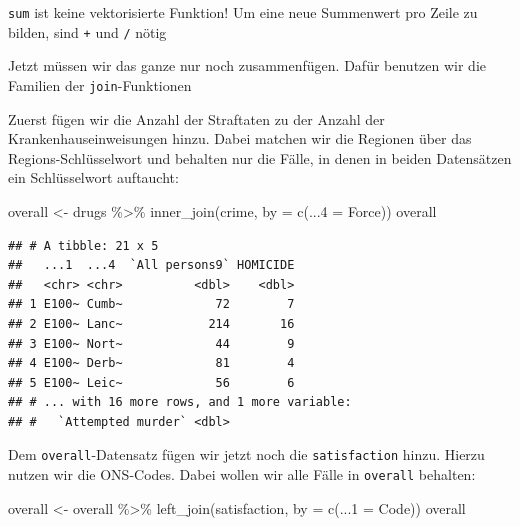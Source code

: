 \documentclass[
]{book}
\newenvironment{Shaded}{\begin{snugshade}}{\end{snugshade}}
\newcommand{\AttributeTok}[1]{\textcolor[rgb]{0.77,0.63,0.00}{#1}}
\newcommand{\FunctionTok}[1]{\textcolor[rgb]{0.00,0.00,0.00}{#1}}
\newcommand{\NormalTok}[1]{#1}
\newcommand{\OtherTok}[1]{\textcolor[rgb]{0.56,0.35,0.01}{#1}}
\newcommand{\SpecialCharTok}[1]{\textcolor[rgb]{0.00,0.00,0.00}{#1}}
\newcommand{\StringTok}[1]{\textcolor[rgb]{0.31,0.60,0.02}{#1}}
\begin{document}
\texttt{sum} ist keine vektorisierte Funktion! Um eine neue Summenwert pro Zeile zu bilden, sind \texttt{+} und \texttt{/} nötig

Jetzt müssen wir das ganze nur noch zusammenfügen. Dafür benutzen wir die Familien der \texttt{join}-Funktionen

Zuerst fügen wir die Anzahl der Straftaten zu der Anzahl der Krankenhauseinweisungen hinzu. Dabei matchen wir die Regionen über das Regions-Schlüsselwort und behalten nur die Fälle, in denen in beiden Datensätzen ein Schlüsselwort auftaucht:

\begin{Shaded}
\begin{Highlighting}[]
\NormalTok{overall }\OtherTok{\textless{}{-}}\NormalTok{ drugs }\SpecialCharTok{\%\textgreater{}\%} 
  \FunctionTok{inner\_join}\NormalTok{(crime, }\AttributeTok{by =} \FunctionTok{c}\NormalTok{(}\StringTok{\textquotesingle{}...4\textquotesingle{}} \OtherTok{=} \StringTok{\textquotesingle{}Force\textquotesingle{}}\NormalTok{))}
\NormalTok{overall}
\end{Highlighting}
\end{Shaded}

\begin{verbatim}
## # A tibble: 21 x 5
##   ...1  ...4  `All persons9` HOMICIDE
##   <chr> <chr>          <dbl>    <dbl>
## 1 E100~ Cumb~             72        7
## 2 E100~ Lanc~            214       16
## 3 E100~ Nort~             44        9
## 4 E100~ Derb~             81        4
## 5 E100~ Leic~             56        6
## # ... with 16 more rows, and 1 more variable:
## #   `Attempted murder` <dbl>
\end{verbatim}

Dem \texttt{overall}-Datensatz fügen wir jetzt noch die \texttt{satisfaction} hinzu. Hierzu nutzen wir die ONS-Codes. Dabei wollen wir alle Fälle in \texttt{overall} behalten:

\begin{Shaded}
\begin{Highlighting}[]
\NormalTok{overall }\OtherTok{\textless{}{-}}\NormalTok{ overall }\SpecialCharTok{\%\textgreater{}\%} 
  \FunctionTok{left\_join}\NormalTok{(satisfaction, }\AttributeTok{by =} \FunctionTok{c}\NormalTok{(}\StringTok{\textquotesingle{}...1\textquotesingle{}} \OtherTok{=} \StringTok{\textquotesingle{}Code\textquotesingle{}}\NormalTok{))}
\NormalTok{overall}
\end{Highlighting}
\end{Shaded}
\end{document}
